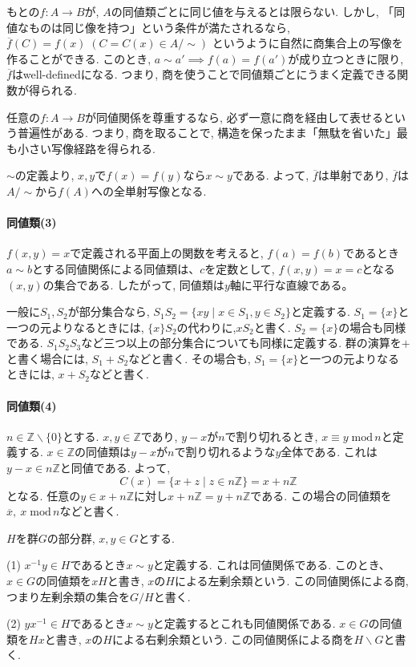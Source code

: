 もとの$f:A\to B$が, $A$の同値類ごとに同じ値を与えるとは限らない.
しかし, 「同値なものは同じ像を持つ」という条件が満たされるなら,
$\overline{f}(C)=f(x)\; (C= C(x)\in A/\sim)$
というように自然に商集合上の写像を作ることができる.
このとき, $a \sim a' \implies f(a)=f(a')$が成り立つときに限り,
$\overline{f}$はwell-definedになる.
つまり, 商を使うことで同値類ごとにうまく定義できる関数が得られる.

任意の$f:A\to B$が同値関係を尊重するなら,
必ず一意に商を経由して表せるという普遍性がある.
つまり, 商を取ることで, 構造を保ったまま「無駄を省いた」最も小さい写像経路を得られる.
\newline

$\sim$の定義より, $x,y$で$f(x)=f(y)$なら$x\sim y$である.
よって, $\overline{f}$は単射であり,
$\overline{f}$は$A/\sim$から$f(A)$への全単射写像となる.\newline

\paragraph*{同値類(3)}
$f(x,y)=x$で定義される平面上の関数を考えると,
$f(a)=f(b)$であるとき$a \sim b$とする同値関係による同値類は、$c$を定数として,
$f(x,y)=x=c$となる$(x,y)$の集合である.
したがって, 同値類は$y$軸に平行な直線である。\newline

一般に$S_1,S_2$が部分集合なら,
$ S_1 S_2 = \{ xy \mid x \in S_1, y \in S_2 \} $と定義する.
$S_1=\{x\}$と一つの元よりなるときには, $\{x\}S_2$の代わりに,$xS_2$と書く.
$S_2=\{x\}$の場合も同様である.
$S_1 S_2 S_3 $など三つ以上の部分集合についても同様に定義する.
群の演算を$+$と書く場合には, $S_1+S_2$などと書く.
その場合も, $S_1=\{x\}$と一つの元よりなるときには, $x+S_2$などと書く.\newline

\paragraph{同値類(4)}
$n\in \mathbb{Z}\backslash\{0\}$とする.
$x,y \in \mathbb{Z}$であり, $y-x$が$n$で割り切れるとき,
$x \equiv y \; \mathrm{mod} \, n$と定義する. 
$x \in \mathbb{Z}$の同値類は$y-x$が$n$で割り切れるような$y$全体である.
これは$y-x \in n\mathbb{Z}$と同値である. よって,
	\[C(x)=\{x+z \mid z \in n\mathbb{Z} \} = x+n\mathbb{Z}\]
となる. 任意の$y \in x+n\mathbb{Z}$に対し$x+n\mathbb{Z}=y+n\mathbb{Z}$である.
この場合の同値類を$\overline{x},\: x \; \mathrm{mod}\, n$などと書く.

\begin{dfn*}
	$H$を群$G$の部分群, $x,y \in G$とする.

	(1) $ x^{-1}y \in H$であるとき$x \sim y$と定義する.
	これは同値関係である. このとき、$x \in G$の同値類を$xH$と書き,
	$x$の$H$による左剰余類という.
	この同値関係による商, つまり左剰余類の集合を$G/H$と書く.

	(2) $yx^{-1} \in H$であるとき$x \sim y$と定義するとこれも同値関係である.
	$x \in G$の同値類を$Hx$と書き, $x$の$H$による右剰余類という.
	この同値関係による商を$H\backslash G$と書く.
\end{dfn*}

